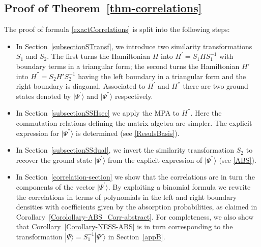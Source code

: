\documentclass[10pt]{article}
\numberwithin{equation}{section}
\numberwithin{equation}{subsection}
\begin{document}
\subsection{Proof of Theorem~\ref{thm-correlations}}
The proof of formula \eqref{exactCorrelations} is split into the following steps:
\begin{itemize}
	\item In Section~\ref{subsectionSTransf}, we introduce two similarity transformations $S_1$ and  $S_2$. 
	 The first turns the Hamiltonian $H$ into $H^{'}= S_{1} H S_{1}^{-1} $ with boundary terms in a triangular form;
	 the second  turns the Hamiltonian $H'$ into $H^{''} = S_{2}H' S_{2}^{-1}$ having the left boundary in a triangular form and the right boundary is diagonal.
	Associated to $H^{'}$ and $H^{''}$ there are two ground states denoted by $|\Psi^{'}\rangle$ and $|\Psi^{''}\rangle$ respectively. 
	\item In Section~\ref{subsectionSSHsec} we apply the MPA to $H^{''}$. Here the commutation relations defining the matrix algebra are simpler. The explicit expression for $|\Psi^{''}\rangle$ is determined (see \eqref{ResulsBasis}).
	\item In Section~\ref{subsectionSSdual}, we invert the similarity transformation $S_2$ to recover  the ground state $|\Psi^{'}\rangle$ from the explicit expression of $|\Psi^{''}\rangle$  (see \eqref{ABS}).
	\item In Section~\ref{correlation-section} we show that the correlations are in turn the components of the vector $|\Psi^{'}\rangle$. 
	By exploiting a binomial formula we rewrite the correlations in terms
of polynomials in the left and right boundary densities with coefficients given by the absorption probabilities, as claimed in Corollary~\ref{Corolollary-ABS_Corr-abstract}.
	For completeness, we also show that Corollary~\ref{Corollary-NESS-ABS} is in turn corresponding to the transformation $|\Psi\rangle = S_{1}^{-1} |\Psi'\rangle$ in Section~\ref{appB}. 
	\end{itemize}
\end{document}
